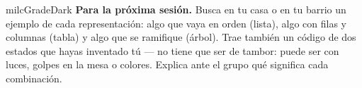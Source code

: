 \documentclass[11pt,letterpaper]{article}
\begin{document}
\begin{infoband}{milcGradeDark}
\textbf{Para la próxima sesión.} Busca en tu casa o en tu barrio un ejemplo de cada representación: algo que vaya en orden (lista), algo con filas y columnas (tabla) y algo que se ramifique (árbol). Trae también un código de dos estados que hayas inventado tú --- no tiene que ser de tambor: puede ser con luces, golpes en la mesa o colores. Explica ante el grupo qué significa cada combinación.
\end{infoband}
\end{document}
